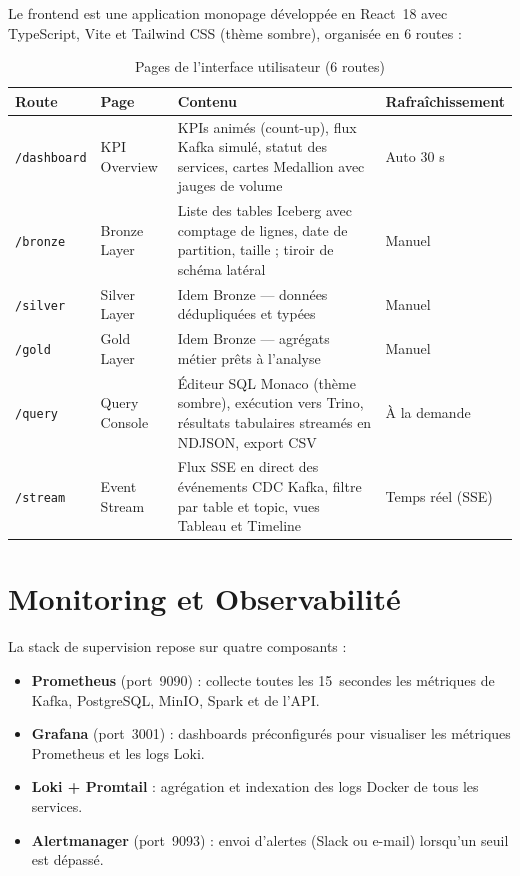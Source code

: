 \documentclass[12pt,a4paper]{report}
\begin{document}
Le frontend est une application monopage développée en React~18 avec
TypeScript, Vite et Tailwind CSS (thème sombre), organisée en 6 routes :

\begin{table}[h]
\centering
\caption{Pages de l'interface utilisateur (6 routes)}
\label{tab:pages}
\renewcommand{\arraystretch}{1.3}
\begin{tabularx}{\linewidth}{llXl}
\toprule
\textbf{Route} & \textbf{Page} & \textbf{Contenu} & \textbf{Rafraîchissement} \\
\midrule
\texttt{/dashboard}
    & KPI Overview
    & KPIs animés (count-up), flux Kafka simulé, statut
      des services, cartes Medallion avec jauges de volume
    & Auto 30 s \\
\texttt{/bronze}
    & Bronze Layer
    & Liste des tables Iceberg avec comptage de lignes,
      date de partition, taille ; tiroir de schéma latéral
    & Manuel \\
\texttt{/silver}
    & Silver Layer
    & Idem Bronze — données dédupliquées et typées
    & Manuel \\
\texttt{/gold}
    & Gold Layer
    & Idem Bronze — agrégats métier prêts à l'analyse
    & Manuel \\
\texttt{/query}
    & Query Console
    & Éditeur SQL Monaco (thème sombre), exécution vers Trino,
      résultats tabulaires streamés en NDJSON, export CSV
    & À la demande \\
\texttt{/stream}
    & Event Stream
    & Flux SSE en direct des événements CDC Kafka,
      filtre par table et topic, vues Tableau et Timeline
    & Temps réel (SSE) \\
\bottomrule
\end{tabularx}
\end{table}

\section{Monitoring et Observabilité}

La stack de supervision repose sur quatre composants :

\begin{itemize}
    \item \textbf{Prometheus} (port~9090) : collecte toutes les 15~secondes
          les métriques de Kafka, PostgreSQL, MinIO, Spark et de l'API.
    \item \textbf{Grafana} (port~3001) : dashboards préconfigurés pour
          visualiser les métriques Prometheus et les logs Loki.
    \item \textbf{Loki + Promtail} : agrégation et indexation des logs Docker
          de tous les services.
    \item \textbf{Alertmanager} (port~9093) : envoi d'alertes (Slack ou e-mail)
          lorsqu'un seuil est dépassé.
\end{itemize}
\end{document}
